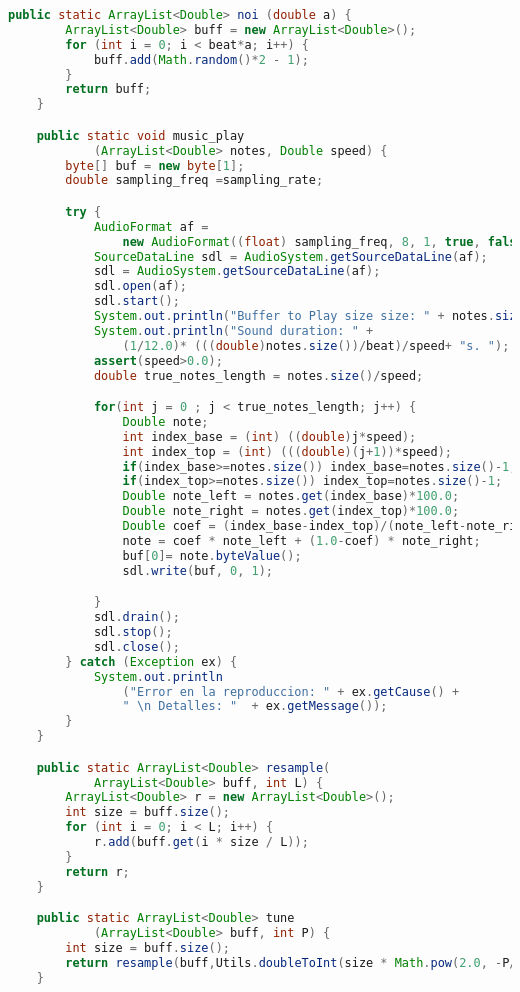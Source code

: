 \documentclass[a4paper]{article}
\begin{document}
\begin{lstlisting}[language=Java]
    public static ArrayList<Double> noi (double a) {
        ArrayList<Double> buff = new ArrayList<Double>();
        for (int i = 0; i < beat*a; i++) {
            buff.add(Math.random()*2 - 1);
        }
        return buff;
    }

    public static void music_play
            (ArrayList<Double> notes, Double speed) {
        byte[] buf = new byte[1];
        double sampling_freq =sampling_rate;

        try {
            AudioFormat af = 
                new AudioFormat((float) sampling_freq, 8, 1, true, false);
            SourceDataLine sdl = AudioSystem.getSourceDataLine(af);
            sdl = AudioSystem.getSourceDataLine(af);
            sdl.open(af);
            sdl.start();
            System.out.println("Buffer to Play size size: " + notes.size());
            System.out.println("Sound duration: " + 
                (1/12.0)* (((double)notes.size())/beat)/speed+ "s. ");
            assert(speed>0.0);
            double true_notes_length = notes.size()/speed;

            for(int j = 0 ; j < true_notes_length; j++) {
                Double note;
                int index_base = (int) ((double)j*speed);
                int index_top = (int) (((double)(j+1))*speed);
                if(index_base>=notes.size()) index_base=notes.size()-1;
                if(index_top>=notes.size()) index_top=notes.size()-1;
                Double note_left = notes.get(index_base)*100.0;
                Double note_right = notes.get(index_top)*100.0;
                Double coef = (index_base-index_top)/(note_left-note_right) ;
                note = coef * note_left + (1.0-coef) * note_right;
                buf[0]= note.byteValue();
                sdl.write(buf, 0, 1);

            }
            sdl.drain();
            sdl.stop();
            sdl.close();
        } catch (Exception ex) {
            System.out.println
                ("Error en la reproduccion: " + ex.getCause() + 
                " \n Detalles: "  + ex.getMessage());
        }
    }

    public static ArrayList<Double> resample(
            ArrayList<Double> buff, int L) {
        ArrayList<Double> r = new ArrayList<Double>();
        int size = buff.size();
        for (int i = 0; i < L; i++) {
            r.add(buff.get(i * size / L));
        }
        return r;
    }

    public static ArrayList<Double> tune
            (ArrayList<Double> buff, int P) {
        int size = buff.size();
        return resample(buff,Utils.doubleToInt(size * Math.pow(2.0, -P/12.0)));
    }


\end{lstlisting}
\end{document}
